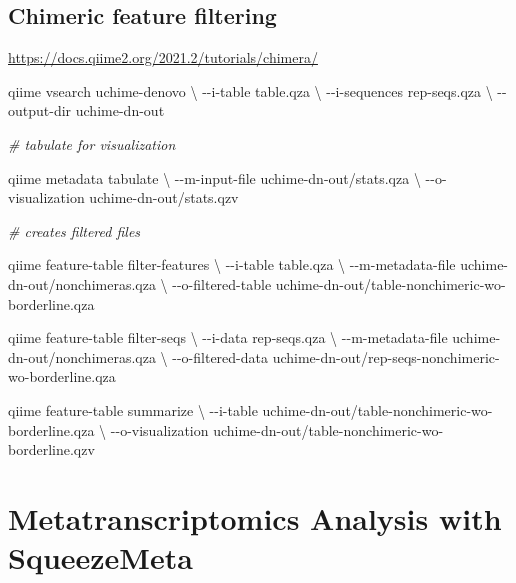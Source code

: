 \documentclass[
]{book}
\newenvironment{Shaded}{\begin{snugshade}}{\end{snugshade}}
\newcommand{\CommentTok}[1]{\textcolor[rgb]{0.56,0.35,0.01}{\textit{#1}}}
\newcommand{\DataTypeTok}[1]{\textcolor[rgb]{0.13,0.29,0.53}{#1}}
\newcommand{\ExtensionTok}[1]{#1}
\newcommand{\NormalTok}[1]{#1}
\begin{document}
\hypertarget{chimeric-feature-filtering}{%
\section{Chimeric feature filtering}\label{chimeric-feature-filtering}}

\url{https://docs.qiime2.org/2021.2/tutorials/chimera/}

\begin{Shaded}
\begin{Highlighting}[]
\ExtensionTok{qiime}\NormalTok{ vsearch uchime{-}denovo }\DataTypeTok{\textbackslash{}}
\NormalTok{{-}{-}i{-}table table.qza }\DataTypeTok{\textbackslash{}}
\NormalTok{{-}{-}i{-}sequences rep{-}seqs.qza }\DataTypeTok{\textbackslash{}}
\NormalTok{{-}{-}output{-}dir uchime{-}dn{-}out}

\CommentTok{\# tabulate for visualization}

\ExtensionTok{qiime}\NormalTok{ metadata tabulate }\DataTypeTok{\textbackslash{}}
\NormalTok{{-}{-}m{-}input{-}file uchime{-}dn{-}out/stats.qza }\DataTypeTok{\textbackslash{}}
\NormalTok{{-}{-}o{-}visualization uchime{-}dn{-}out/stats.qzv}

\CommentTok{\# creates filtered files}

\ExtensionTok{qiime}\NormalTok{ feature{-}table filter{-}features }\DataTypeTok{\textbackslash{}}
\NormalTok{{-}{-}i{-}table table.qza }\DataTypeTok{\textbackslash{}}
\NormalTok{{-}{-}m{-}metadata{-}file uchime{-}dn{-}out/nonchimeras.qza }\DataTypeTok{\textbackslash{}}
\NormalTok{{-}{-}o{-}filtered{-}table uchime{-}dn{-}out/table{-}nonchimeric{-}wo{-}borderline.qza }

\ExtensionTok{qiime}\NormalTok{ feature{-}table filter{-}seqs }\DataTypeTok{\textbackslash{}}
\NormalTok{{-}{-}i{-}data rep{-}seqs.qza }\DataTypeTok{\textbackslash{}}
\NormalTok{{-}{-}m{-}metadata{-}file uchime{-}dn{-}out/nonchimeras.qza }\DataTypeTok{\textbackslash{}}
\NormalTok{{-}{-}o{-}filtered{-}data uchime{-}dn{-}out/rep{-}seqs{-}nonchimeric{-}wo{-}borderline.qza }

\ExtensionTok{qiime}\NormalTok{ feature{-}table summarize }\DataTypeTok{\textbackslash{}}
\NormalTok{{-}{-}i{-}table uchime{-}dn{-}out/table{-}nonchimeric{-}wo{-}borderline.qza }\DataTypeTok{\textbackslash{}}
\NormalTok{{-}{-}o{-}visualization uchime{-}dn{-}out/table{-}nonchimeric{-}wo{-}borderline.qzv}
\end{Highlighting}
\end{Shaded}

\hypertarget{metatranscriptomics-analysis-with-squeezemeta}{%
\chapter{Metatranscriptomics Analysis with SqueezeMeta}\label{metatranscriptomics-analysis-with-squeezemeta}}
\end{document}
